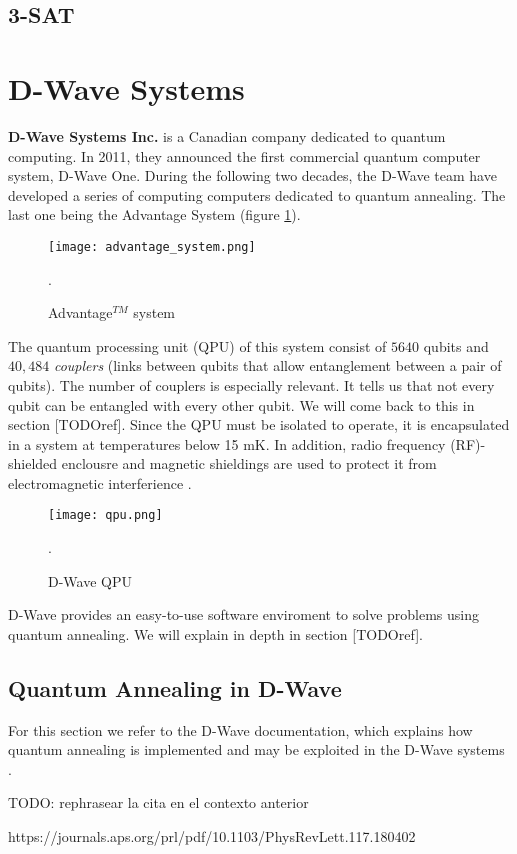 
\subsection{3-SAT}




\section{D-Wave Systems}


\textbf{D-Wave Systems Inc.} is a Canadian company dedicated to quantum computing. In 2011, they announced the first commercial quantum computer system, D-Wave One. During the following two decades, the D-Wave team have developed a series of computing computers dedicated to quantum annealing. The last one being the Advantage System (figure \ref{fig 2.2}).

\begin{figure}[h]
	\texttt{[image: advantage\_system.png]}
	\centering
	\caption{Advantage$^{TM}$ system}.
	\label{fig 2.2}
\end{figure}

The quantum processing unit (QPU) of this system consist of $5640$ qubits and $40,484$ \emph{couplers} (links between qubits that allow entanglement between a pair of qubits). The number of couplers is especially relevant. It tells us that not every qubit can be entangled with every other qubit. We will come back to this in section [TODOref]. Since the QPU must be isolated to operate, it is encapsulated in a system at temperatures below 15 mK. In addition, radio frequency (RF)-shielded enclousre and magnetic shieldings are used to protect it from electromagnetic interferience \cite{DWaveDoc}.

\begin{figure}[h]
	\texttt{[image: qpu.png]}
	\centering
	\caption{D-Wave QPU}.
	\label{fig 2.3}
\end{figure}

D-Wave provides an easy-to-use software enviroment to solve problems using quantum annealing. We will explain in depth in section [TODOref].


\subsection{Quantum Annealing in D-Wave}
\label{quantum-annealing-dwave}


For this section we refer to the D-Wave documentation, which explains how quantum annealing is implemented and may be exploited in the D-Wave systems \cite{DWaveDoc-QuantumAnnealing}.




TODO: rephrasear la cita en el contexto anterior











https://journals.aps.org/prl/pdf/10.1103/PhysRevLett.117.180402




